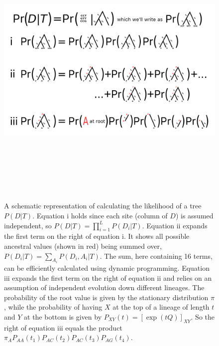 \documentclass[11pt]{article}
\begin{document}
\begin{landscape}
 \begin{figure}[hbtp]
\includegraphics[width = 23cm, height = 13.7cm]{figures/treeprob.pdf}
\caption{A schematic representation of calculating the likelihood of a tree $P(D|T)$.  Equation i holds since each site (column of $D$) is assumed independent,  so $P(D|T) = \prod_{i = 1}^L P(D_i|T)$.  Equation ii expands the first term on the right of equation i.  It shows all possible ancestral values (shown in red) being summed over, $P(D_i|T) = \sum_{A_i} P(D_i, A_i|T)$.  The sum, here containing 16 terms,  can be efficiently calculated using dynamic programming. Equation iii expands the first term on the right of equation ii and relies on an assumption of independent evolution down different lineages.  The probability of the root value is given by the stationary distribution $\pi$, while the probability of having $X$ at the top of a lineage of length $t$ and $Y$ at the bottom is given by $P_{XY}(t) = [\exp{(tQ)}]_{XY}$.  So the right of equation iii equals the product $\pi_A P_{AA}(t_1)P_{AC}(t_2)P_{AC}(t_3)P_{AG}(t_4)$.}
\label{fig:treeprob}
\end{figure}
\end{landscape}



\end{document}
